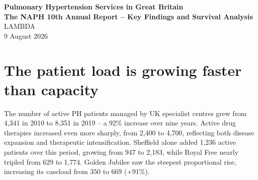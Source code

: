 \documentclass[11pt,a4paper]{article}
\begin{document}
\thispagestyle{firstpage}

\begin{center}
  \vspace*{3cm}
  {\LARGE \textbf{Pulmonary Hypertension Services in Great Britain\\The NAPH 10th Annual Report -- Key Findings and Survival Analysis}} \\[0.5em]
  {\large LAMBDA} \\[0.5em]
  {\large 9 August 2026}
\end{center}

\begin{abstract}
This analysis examines the National Audit of Pulmonary Hypertension (NAPH) 10th Annual Report covering 2018--19 data from eight specialist pulmonary hypertension centres across England, Scotland, and Wales. The report evaluates clinical care quality against 13 national standards, analyses survival outcomes for over 4,800 IPAH patients diagnosed since 2009, and reviews local action plans from participating centres. Eleven of 13 national standards were met at a national level, demonstrating substantial improvement in diagnosis timeliness, cardiac catheterisation compliance, and quality-of-life recording. However, two critical areas remain unresolved: only 11\% of CTEPH patients received pulmonary endarterectomy within four months (target 90\%), and vasoreactivity testing was recorded for only 57\% of eligible IPAH patients. Survival curves reveal stark differences by comorbidity status, age, sex, and WHO functional class, with IPAH patients without comorbidities achieving 80\% five-year survival compared to just 25\% for those with comorbidities.
\end{abstract}

\newpage

\section{The patient load is growing faster than capacity}

The number of active PH patients managed by UK specialist centres grew from 4,341 in 2010 to 8,351 in 2019 -- a 92\% increase over nine years. Active drug therapies increased even more sharply, from 2,400 to 4,700, reflecting both disease expansion and therapeutic intensification. Sheffield alone added 1,236 active patients over this period, growing from 947 to 2,183, while Royal Free nearly tripled from 629 to 1,774. Golden Jubilee saw the steepest proportional rise, increasing its caseload from 350 to 669 (+91\%).
\end{document}
